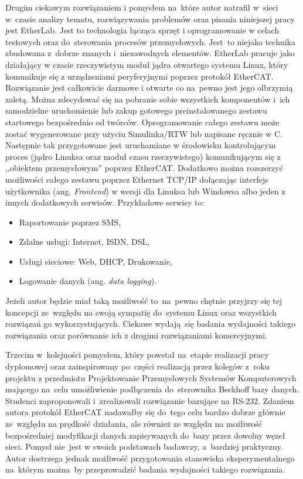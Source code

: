 Drugim ciekawym rozwiązaniem i pomysłem na~które autor natrafił w~sieci w~czasie analizy tematu, rozwiązywania problemów oraz pisania niniejszej pracy jest EtherLab. Jest to technologia łącząca sprzęt i oprogramowanie w celach testowych oraz do~sterowania procesów przemysłowych. Jest~to niejako technika zbudowana z~dobrze znanych i~niezawodnych elementów.
EtherLab pracuje jako działający w czasie rzeczywistym moduł jądra otwartego systemu Linux, który komunikuje się z urządzeniami peryferyjnymi poprzez protokół EtherCAT. Rozwiązanie jest całkowicie darmowe i otwarte co na~pewno jest jego olbrzymią zaletą. Można zdecydować się na pobranie sobie wszystkich komponentów i~ich samodzielne uruchomienie lub zakup gotowego preinstalowanego zestawu startowego bezpośrednio od twórców. 
Oprogramowanie całego zestawu może zostać wygenerowane przy użyciu Simulinka/RTW lub napisane ręcznie w C. Następnie tak przygotowane jest uruchamiane w środowisku kontrolującym proces (jądro Linuksa oraz moduł czasu rzeczywistego) komunikującym się z ,,obiektem przemysłowym'' poprzez EtherCAT. Dodatkowo można rozszerzyć możliwości całego zestawu poprzez Ethernet TCP/IP dołączając interfejs użytkownika (ang. \textit{Frontend}) w wersji dla Linuksa lub Windowsa albo jeden z innych dodatkowych serwisów. Przykładowe serwisy to:
\begin{itemize}
\item Raportowanie poprzez SMS,
\item Zdalne usługi: Internet, ISDN, DSL,
\item Usługi sieciowe: Web, DHCP, Drukowanie,
\item Logowanie danych (ang. \textit{data logging}).
\end{itemize}
Jeżeli autor będzie miał taką możliwość to~na~pewno chętnie przyjrzy się tej koncepcji ze~względu na swoją sympatię do~systemu Linux oraz wszystkich rozwiązań go wykorzystujących. Ciekawe wydają~się badania wydajności takiego rozwiązania oraz porównanie ich z drogimi rozwiązaniami komercyjnymi.

Trzecim w~kolejności pomysłem, który powstał na~etapie realizacji pracy dyplomowej oraz zainspirowany po~części realizacją przez kolegów z~roku projektu z przedmiotu Projektowanie Przemysłowych Systemów Komputerowych mającego na~celu umożliwienie podłączenia do~sterownika Beckhoff bazy danych. Studenci zaproponowali i~zrealizowali rozwiązanie bazujące na RS-232. Zdaniem autora protokół EtherCAT nadawałby się do~tego celu bardzo dobrze głównie ze~względu na prędkość działania, ale również ze względu na możliwość bezpośredniej modyfikacji danych zapisywanych do~bazy przez dowolny węzeł sieci. Pomysł nie~jest w swoich podstawach badawczy, a~bardziej praktyczny. Autor dostrzega jednak możliwość przygotowania stanowiska eksperymentalnego na~którym można~by przeprowadzić badania wydajności takiego rozwiązania.

